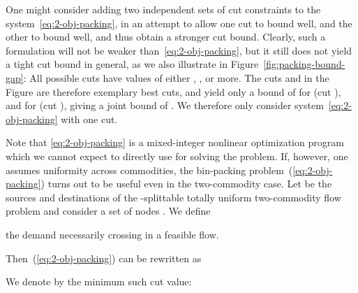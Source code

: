 One might consider adding two independent sets of cut constraints to
the system~\eqref{eq:2-obj-packing}, in an attempt to allow one cut to
bound  well, and the other to bound  well, and thus obtain a
stronger cut bound. Clearly, such a formulation will not be weaker
than~\eqref{eq:2-obj-packing}, but it still does not yield a tight cut
bound in general, as we also illustrate in
Figure~\ref{fig:packing-bound-gap}: All possible cuts have values of
either , ,  or more. The cuts  and  in the Figure are
therefore exemplary best cuts, and yield only a bound of  for 
(cut ), and  for  (cut ), giving a joint bound of . We therefore only consider system~\eqref{eq:2-obj-packing} with
one cut.

Note that \eqref{eq:2-obj-packing} is a mixed-integer nonlinear optimization
program which we cannot expect to directly use for solving the problem.
If, however, one assumes uniformity across commodities, the
bin-packing problem~(\ref{eq:2-obj-packing}) turns out to be useful
even in the two-commodity case. Let  be the
sources and destinations of the -splittable totally uniform
two-commodity flow problem and consider a set of nodes .
We define 

the demand necessarily crossing   in a feasible flow.

Then~(\ref{eq:2-obj-packing}) can be rewritten as



We denote by  the minimum such cut value:


